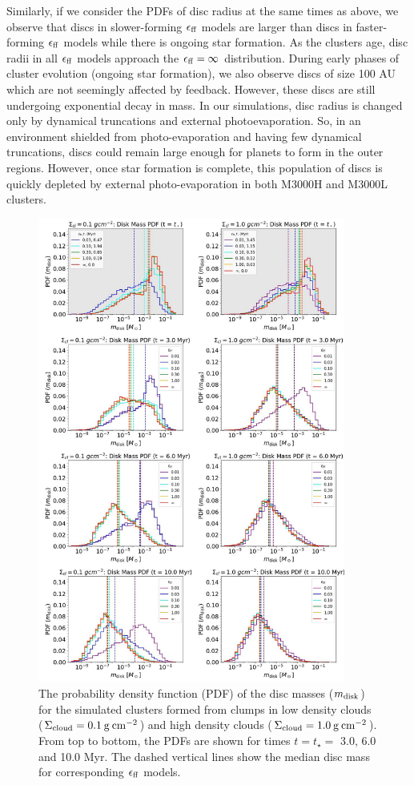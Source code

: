 \documentclass[fleqn,usenatbib]{mnras}
\newcommand\sfeff{\ensuremath{\epsilon_{\rm ff}}\xspace}   %
\newcommand\Sigmacloud{\ensuremath{\Sigma_{\rm cloud}}\xspace} %
\begin{document}
Similarly, if we consider the PDFs of disc radius at the same times as above, we observe that discs in slower-forming \sfeff models are larger than discs in faster-forming \sfeff models while there is ongoing star formation. As the clusters age, disc radii in all \sfeff models approach the $\sfeff = \infty$ distribution. During early phases of cluster evolution (ongoing star formation), we also observe discs of size 100 AU which are not seemingly affected by feedback. However, these discs are still undergoing exponential decay in mass. In our simulations, disc radius is changed only by dynamical truncations and external photoevaporation. So, in an environment shielded from photo-evaporation and having few dynamical truncations, discs could remain large enough for planets to form in the outer regions. However, once star formation is complete, this population of discs is quickly depleted by external photo-evaporation in both M3000H and M3000L clusters.  

\begin{figure}
    \centering
    \includegraphics[width=0.9\textwidth, height=0.9\textheight]{figures/PanelPDFDiscMassEvolution.pdf}
    \caption{The probability density function (PDF) of the disc masses ($m_{\rm disk}$) for the simulated clusters formed from clumps in low density clouds ($\Sigmacloud =0.1\:\rm g\:cm^{-2}$) and high density clouds ($\Sigmacloud=1.0\:\rm g\: cm^{-2}$). From top to bottom, the PDFs are shown for times $t = t_{\star} =$ 3.0, 6.0 and 10.0 Myr. The dashed vertical lines show the median disc mass for corresponding \sfeff models.}
    \label{fig:diskmasspdf}
\end{figure}
\end{document}
